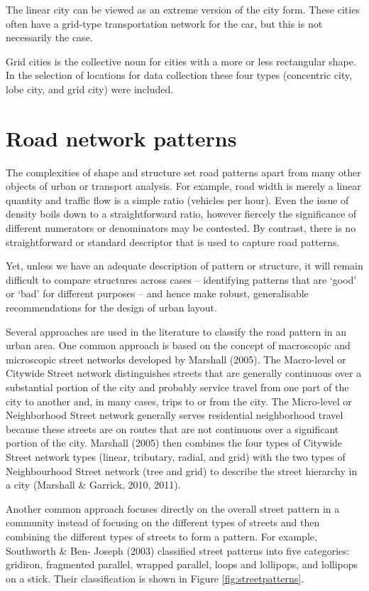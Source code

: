 The linear city can be viewed as an extreme version of the city form. These cities often have a grid-type transportation network for the car, but this is not necessarily the case. 

Grid cities is the collective noun for cities with a more or less rectangular shape. In the selection of locations for data collection these four types (concentric city, lobe city, and grid city) were included.


\section{Road network patterns}
The complexities of shape and structure set road patterns apart from many other objects of urban or transport analysis. For example, road width is merely a linear quantity and traffic flow is a simple ratio (vehicles per hour). Even the issue of density boils down to a straightforward ratio, however fiercely the significance of different numerators or denominators may be contested. By contrast, there is no straightforward or standard descriptor that is used to capture road patterns. 

Yet, unless we have an adequate description of pattern or structure, it will remain difficult to compare structures across cases – identifying patterns that are ‘good’ or ‘bad’ for different purposes – and hence make robust, generalisable recommendations for the design of urban layout.

Several approaches are used in the literature to classify the road pattern in an urban area. One common approach is based on the concept of macroscopic and microscopic street networks developed by Marshall (2005). The Macro-level or Citywide Street network distinguishes streets that are generally continuous over a substantial portion of the city and probably service travel from one part of the city to another and, in many cases, trips to or from the city. The Micro-level or Neighborhood Street network generally serves residential neighborhood travel because these streets are on routes that are not continuous over a significant portion of the city. Marshall (2005) then combines the four types of Citywide Street network types (linear, tributary, radial, and grid) with the two types of Neighbourhood Street network (tree and grid) to describe the street hierarchy in a city (Marshall & Garrick, 2010, 2011). 

Another common approach focuses directly on the overall street pattern in a community instead of focusing on the different types of streets and then combining the different types of streets to form a pattern. For example, Southworth \& Ben- Joseph (2003) classified street patterns into five categories: gridiron, fragmented parallel, wrapped parallel, loops and lollipops, and lollipops on a stick. Their classification is shown in Figure \ref{fig:streetpatterns}.

